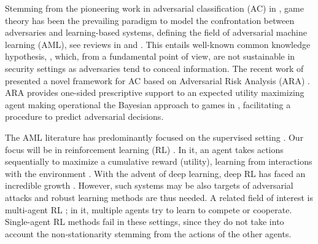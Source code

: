 Stemming from the pioneering work in adversarial classification (AC) in
\parencite{dalvi2004adversarial}, 
 game theory \parencite{menache2011network}
 has been the prevailing paradigm to model the confrontation
between adversaries and learning-based systems, 
defining the field of adversarial machine learning (AML),
 see reviews in 
\parencite{BIGGIO2018317} and \parencite{doi:10.1002/widm.1259}. This entails
well-known common
knowledge hypothesis, \parencite{hargreaves2004game}, which, from
a fundamental point of view, are  not sustainable in 
security settings 
as adversaries tend to %
conceal information. %
The recent work of \cite{naveiro2018adversarial} presented a novel 
framework for AC based on Adversarial Risk Analysis (ARA) \parencite{roponen}.
ARA provides one-sided prescriptive
support to an expected utility maximizing agent
 making operational the Bayesian approach to games in \parencite{kadane1982subjective, raiffa1982art}, facilitating a procedure to
predict adversarial decisions. 

The AML literature has predominantly focused on
the supervised setting \parencite{BIGGIO2018317}.
Our focus will be in reinforcement learning (RL) \parencite{sutton2012reinforcement}.
In it, an agent takes actions
sequentially to maximize a cumulative reward (utility), learning from
interactions with the environment \parencite{kaelbling1996reinforcement}. With the advent of deep learning, deep RL
has faced an incredible growth
\parencite{mnih2015human,silver2017mastering,chinorros}. 
However, such systems may be also targets of 
adversarial attacks \parencite{huang2017adversarial,lin2017tactics} 
and robust learning methods are thus
needed. 
A related field of interest is multi-agent RL \parencite{marl_over,leelee};
in it, multiple 
agents try to learn to compete or cooperate. Single-agent RL methods fail in
these settings, since they do not take into account 
the non-stationarity 
stemming from the actions of the other agents. %

